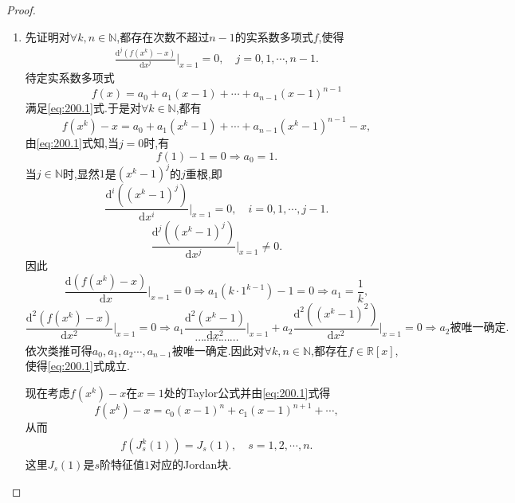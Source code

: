 \documentclass[../../main.tex]{subfiles}
\begin{document}
\begin{proof}
\begin{enumerate}[(1)]
\item 先证明对$\forall k,n\in \mathbb{N}$,都存在次数不超过$n-1$的实系数多项式$f$,使得
\begin{align}
\frac{\mathrm{d}^j\left( f\left( x^k \right) -x \right)}{\mathrm{d}x^j}\bigg|_{x=1}=0,\quad j=0,1,\cdots ,n-1.
\label{eq:200.1}
\end{align}
待定实系数多项式
\[
f(x) =a_0+a_1(x-1) +\cdots +a_{n-1}(x-1) ^{n-1}
\]
满足\eqref{eq:200.1}式.于是对$\forall k\in \mathbb{N}$,都有
\[
f(x^k) -x=a_0+a_1(x^k-1) +\cdots +a_{n-1}(x^k-1) ^{n-1}-x,
\]
由\eqref{eq:200.1}式知,当$j=0$时,有
\[
f(1) -1=0\Longrightarrow a_0=1.
\]
当$j\in \mathbb{N}$时,显然$1$是$(x^k-1)^j$的$j$重根,即
\[
\frac{\mathrm{d}^i\left( (x^k-1)^j \right)}{\mathrm{d}x^i}\bigg|_{x=1}=0,\quad i=0,1,\cdots ,j-1.
\]
\[
\frac{\mathrm{d}^j\left( (x^k-1)^j \right)}{\mathrm{d}x^j}\bigg|_{x=1}\ne 0.
\]
因此
\[
\frac{\mathrm{d}\left( f(x^k) -x \right)}{\mathrm{d}x}\bigg|_{x=1}=0\Longrightarrow a_1\left( k\cdot 1^{k-1} \right) -1=0\Longrightarrow a_1=\frac{1}{k},
\]
\[
\frac{\mathrm{d}^2\left( f(x^k) -x \right)}{\mathrm{d}x^2}\bigg|_{x=1}=0\Longrightarrow a_1\frac{\mathrm{d}^2\left( x^k-1 \right)}{\mathrm{d}x^2}\bigg|_{x=1}+a_2\frac{\mathrm{d}^2\left( (x^k-1)^2 \right)}{\mathrm{d}x^2}\bigg|_{x=1}=0\Longrightarrow a_2\text{被唯一确定}.
\]
\[
\cdots \cdots \cdots \cdots \cdots
\]
依次类推可得$a_0,a_1,a_2\cdots ,a_{n-1}$被唯一确定.因此对$\forall k,n\in \mathbb{N}$,都存在$f\in \mathbb{R}[x]$,使得\eqref{eq:200.1}式成立.

现在考虑$f(x^k) -x$在$x=1$处的Taylor公式并由\eqref{eq:200.1}式得
\[
f(x^k) -x=c_0(x-1)^n+c_1(x-1)^{n+1}+\cdots,
\]
从而
\begin{align*}
f\left( J_{s}^{k}(1) \right) =J_s(1),\quad s=1,2,\cdots ,n.
\end{align*}
这里$J_s(1)$是$s$阶特征值$1$对应的Jordan块.


\end{enumerate}
\end{proof}
\end{document}
